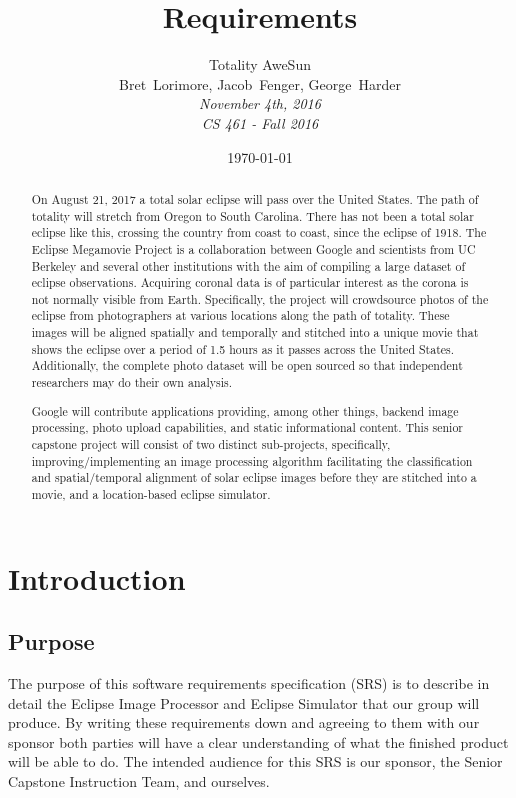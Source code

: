 \documentclass[10pt, onecolumn, draftclsnofoot, letterpaper, compsoc]{IEEEtran}
\title{Requirements}
\date{\today} %
\author{Totality AweSun \\
		Bret~Lorimore, Jacob~Fenger, George~Harder \\
		\textit{November 4th, 2016 \\
		CS 461 - Fall 2016}}
\begin{document}

\maketitle

\begin{abstract}

On August 21, 2017 a total solar eclipse will pass over the United States. The
path of totality will stretch from Oregon to South Carolina. There has not been
a total solar eclipse like this, crossing the country from coast to coast, since
the eclipse of 1918. The Eclipse Megamovie Project is a collaboration between
Google and scientists from UC Berkeley and several other institutions with the
aim of compiling a large dataset of eclipse observations. Acquiring coronal data
is of particular interest as the corona is not normally visible from Earth.
Specifically, the project will crowdsource photos of the eclipse from
photographers at various locations along the path of totality. These images will
be aligned spatially and temporally and stitched into a unique movie that shows
the eclipse over a period of 1.5 hours as it passes across the United States.
Additionally, the complete photo dataset will be open sourced so that
independent researchers may do their own analysis.

Google will contribute applications providing, among other things, backend image
processing, photo upload capabilities, and static informational content. This
senior capstone project will consist of two distinct sub-projects, specifically,
improving/implementing an image processing algorithm facilitating the
classification and spatial/temporal alignment of solar eclipse images before
they are stitched into a movie, and a location-based eclipse simulator.

\end{abstract}


\newpage

\tableofcontents

\newpage
\section{Introduction}

\subsection{Purpose}
The purpose of this software requirements specification (SRS) is to describe in
detail the Eclipse Image Processor and Eclipse Simulator that our group will 
produce. By writing these requirements down and agreeing to them with our 
sponsor both parties will have a clear understanding of what the finished 
product will be able to do. The intended audience for this SRS is our sponsor, 
the Senior Capstone Instruction Team, and ourselves.
\end{document}
